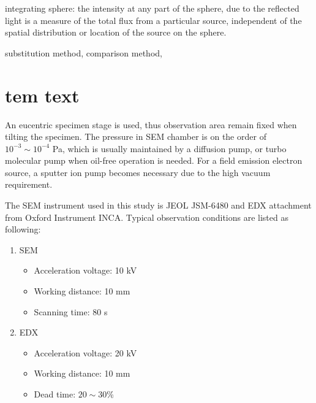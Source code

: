 integrating sphere: the intensity at any part of the sphere, due to the reflected light is a measure of the total flux from a particular source, independent of the spatial distribution or location of the source on the sphere. 

substitution method, comparison method, 

\fi
\section{tem text}


\iffalse
An eucentric specimen stage is used, thus observation area remain fixed when tilting the specimen. The pressure in SEM chamber is on the order of $10^{-3} \sim 10^{-4}$ Pa, which is usually maintained by a diffusion pump, or turbo molecular pump when oil-free operation is needed. For a field emission electron source, a sputter ion pump becomes necessary due to the high vacuum requirement. 

The SEM instrument used in this study is JEOL JSM-6480 and EDX attachment from Oxford Instrument INCA. Typical observation conditions are listed as following:

\begin{enumerate}
\item SEM
\begin{itemize}

\item Acceleration voltage: 10 kV
\item Working distance: 10 mm
\item Scanning time: 80 s
\end{itemize}
\item EDX
\begin{itemize}

\item Acceleration voltage: 20 kV
\item Working distance: 10 mm
\item Dead time: $20\sim30$\%
\end{itemize}
\end{enumerate}


